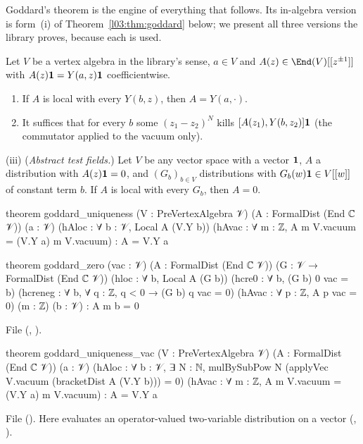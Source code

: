 Goddard's theorem is the engine of everything that follows. Its in-algebra version is form~(i) of
Theorem~\ref{l03:thm:goddard} below; we present all three versions the library proves, because each is used.

\begin{theorem}\label{l03:thm:goddard}
Let $V$ be a vertex algebra in the library's sense, $a\in V$ and $A(z)\in\End(V)[[z^{\pm1}]]$ with
$A(z)\mathbf{1} = Y(a,z)\mathbf{1}$ coefficientwise.
\begin{enumerate}[label=(\roman*)]
\item If $A$ is local with every $Y(b,z)$, then $A = Y(a,\cdot)$.
\item It suffices that for every $b$ some $(z_1-z_2)^N$ kills $[A(z_1),Y(b,z_2)]\mathbf{1}$ (the
  commutator applied to the vacuum only).
\end{enumerate}
(iii) (\emph{Abstract test fields.}) Let $V$ be any vector space with a vector $\mathbf{1}$, $A$ a
distribution with $A(z)\mathbf{1} = 0$, and $(G_b)_{b\in V}$ distributions with $G_b(w)\mathbf{1}\in V[[w]]$
of constant term $b$. If $A$ is local with every $G_b$, then $A = 0$.
\end{theorem}
\begin{leancode}
theorem goddard_uniqueness (V : PreVertexAlgebra 𝒱) (A : FormalDist (End ℂ 𝒱)) (a : 𝒱)
    (hAloc : ∀ b : 𝒱, Local A (V.Y b))
    (hAvac : ∀ m : ℤ, A m V.vacuum = (V.Y a) m V.vacuum) :
    A = V.Y a

theorem goddard_zero (vac : 𝒱) (A : FormalDist (End ℂ 𝒱)) (G : 𝒱 → FormalDist (End ℂ 𝒱))
    (hloc : ∀ b, Local A (G b))
    (hcre0 : ∀ b, (G b) 0 vac = b)
    (hcreneg : ∀ b, ∀ q : ℤ, q < 0 → (G b) q vac = 0)
    (hAvac : ∀ p : ℤ, A p vac = 0)
    (m : ℤ) (b : 𝒱) : A m b = 0
\end{leancode}
File  (,
).
\begin{leancode}
theorem goddard_uniqueness_vac (V : PreVertexAlgebra 𝒱) (A : FormalDist (End ℂ 𝒱)) (a : 𝒱)
    (hAloc : ∀ b : 𝒱, ∃ N : ℕ, mulBySubPow N (applyVec V.vacuum (bracketDist A (V.Y b))) = 0)
    (hAvac : ∀ m : ℤ, A m V.vacuum = (V.Y a) m V.vacuum) :
    A = V.Y a
\end{leancode}
File  ().
Here  evaluates an operator-valued two-variable distribution on a
vector (, ).

